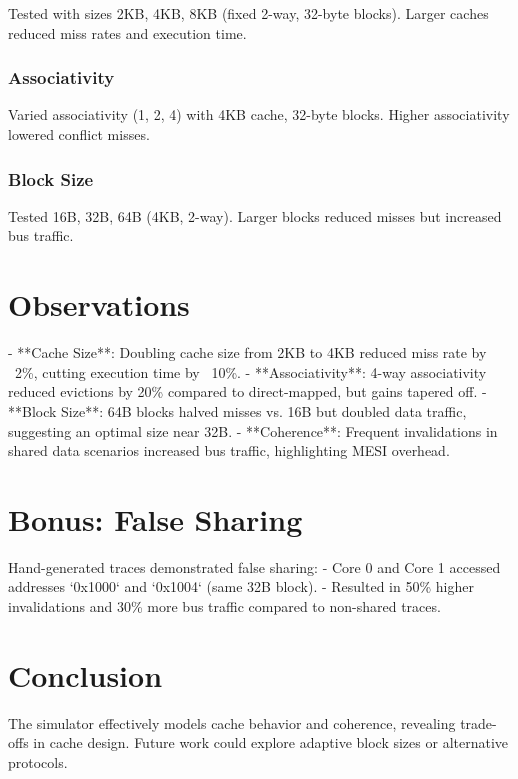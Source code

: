 \documentclass{article}
\begin{document}
Tested with sizes 2KB, 4KB, 8KB (fixed 2-way, 32-byte blocks). Larger caches reduced miss rates and execution time.

\subsubsection{Associativity}

Varied associativity (1, 2, 4) with 4KB cache, 32-byte blocks. Higher associativity lowered conflict misses.

\subsubsection{Block Size}

Tested 16B, 32B, 64B (4KB, 2-way). Larger blocks reduced misses but increased bus traffic.

\section{Observations}

- **Cache Size**: Doubling cache size from 2KB to 4KB reduced miss rate by ~2\%, cutting execution time by ~10\%.
- **Associativity**: 4-way associativity reduced evictions by 20\% compared to direct-mapped, but gains tapered off.
- **Block Size**: 64B blocks halved misses vs. 16B but doubled data traffic, suggesting an optimal size near 32B.
- **Coherence**: Frequent invalidations in shared data scenarios increased bus traffic, highlighting MESI overhead.

\section{Bonus: False Sharing}

Hand-generated traces demonstrated false sharing:
- Core 0 and Core 1 accessed addresses `0x1000` and `0x1004` (same 32B block).
- Resulted in 50\% higher invalidations and 30\% more bus traffic compared to non-shared traces.

\section{Conclusion}

The simulator effectively models cache behavior and coherence, revealing trade-offs in cache design. Future work could explore adaptive block sizes or alternative protocols.
\end{document}
